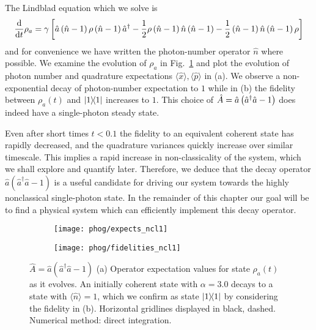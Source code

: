 The Lindblad equation which we solve is
\begin{equation}\label{eqn:phog_ncl_lindblad}
\frac{\mathrm{d}}{\mathrm{d}t} \rho_a = \gamma \left[ \hat{a}\left(\hat{n}-1\right) \rho \left(\hat{n}-1\right)\hat{a}^\dagger - \frac{1}{2} \rho \left(\hat{n}-1\right) \hat{n} \left(\hat{n}-1\right) - \frac{1}{2} \left(\hat{n}-1\right)\hat{n}\left(\hat{n}-1\right) \rho \right]
\end{equation}
and for convenience we have written the photon-number operator $\hat{n}$ where possible.
We examine the evolution of $\rho_a$ in Fig.~\ref{fig:phog_A_ncl} and plot the evolution of photon number and quadrature expectations $\langle \hat{x}\rangle, \langle \hat{p}\rangle$ in (a). We observe a non-exponential decay of photon-number expectation to $1$ %
while in (b) the fidelity between $\rho_a\left(t\right)$ and $\dyad{1}$ increases to $1$. This choice of $\hat{A} = \hat{a}\left(\hat{a}^\dagger \hat{a} - 1\right)$ does indeed have a single-photon steady state. 

Even after short times $t < 0.1$ the fidelity to an equivalent coherent state has rapidly decreased, and the quadrature variances quickly increase over similar timescale. This implies a rapid increase in non-classicality of the system, which we shall explore and quantify later. Therefore, we deduce that the decay operator $\hat{a}\left(\hat{a}^\dagger \hat{a} - 1\right)$ is a useful candidate for driving our system towards the highly nonclassical single-photon state. In the remainder of this chapter our goal will be to find a physical system which can efficiently implement this decay operator.



\begin{figure}[htp]
\centering
	\begin{subfigure}{0.49\linewidth}
	\centering
	\texttt{[image: phog/expects\_ncl1]}
	\caption{}
	\end{subfigure}
	\begin{subfigure}{0.49\linewidth}
	\centering
	\texttt{[image: phog/fidelities\_ncl1]}
	\caption{}
	\end{subfigure}
\caption{\label{fig:phog_A_ncl}$\hat{A} = \hat{a}\left(\hat{a}^\dagger \hat{a} - 1\right)$ (a) Operator expectation values for state $\rho_a\left(t\right)$ as it evolves. An initially coherent state with $\alpha=3.0$ decays to a state with $\langle \hat{n}\rangle=1$, which we confirm as state $\dyad{1}$ by considering the fidelity in (b). Horizontal gridlines displayed in black, dashed. Numerical method: direct integration.}
\end{figure}

